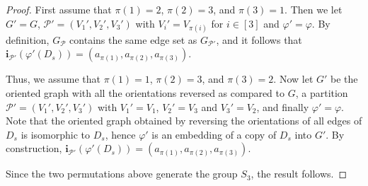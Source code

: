 \documentclass[11pt]{amsart}
\newcommand{\CP}{\mathcal{P}}
\begin{document}
\begin{proof}
    First assume that $\pi(1)=2$, $\pi(2)=3$, and $\pi(3)=1$. Then we let $G'=G$, $\CP'=(V_1',V_2',V_3')$ with $V_i'=V_{\pi(i)}$ for $i\in [3]$ and $\varphi'=\varphi$.
    By definition, $G_\CP$ contains the same edge set as $G_{\CP'}$, and it follows that $\mathbf{i}_{\CP'}(\varphi'(D_s))=(a_{\pi(1)},a_{\pi(2)},a_{\pi(3)})$.
    
    Thus, we assume that $\pi(1)=1$, $\pi(2)=3$, and $\pi(3)=2$.
    Now let $G'$ be the oriented graph with all the orientations reversed as compared to $G$, a partition $\CP' = (V_1',V_2',V_3')$ with $V_1'=V_1$, $V_2'=V_3$ and $V_3'=V_2$, and finally $\varphi'=\varphi$. Note that the oriented graph obtained by reversing the orientations of all edges of $D_s$ is isomorphic to $D_s$, hence $\varphi'$ is an embedding of a copy of $D_s$ into $G'$.
    By construction, $\mathbf{i}_{\CP'}(\varphi'(D_s))=(a_{\pi(1)},a_{\pi(2)},a_{\pi(3)})$.

    Since the two permutations above generate the group $S_3$, the result follows.
\end{proof}
\end{document}
